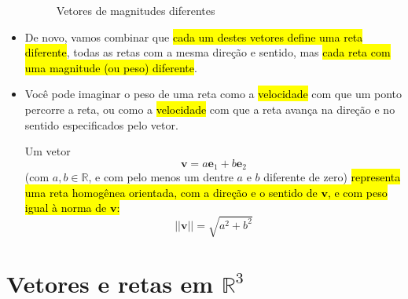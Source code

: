\documentclass[
  letterpaper,
  DIV=11,
  numbers=noendperiod]{scrreprt}
\begin{document}
\begin{itemize}
\begin{figure}[t]
{  }

  \caption{\label{fig-vetores}Vetores de magnitudes diferentes}

  \end{figure}
\item
  De novo, vamos combinar que {\hl{cada um destes vetores define uma
  reta diferente}}, todas as retas com a mesma direção e sentido, mas
  {\hl{cada reta com uma magnitude (ou peso) diferente}}.
\item
  Você pode imaginar o peso de uma reta como a {\hl{velocidade}} com que
  um ponto percorre a reta, ou como a {\hl{velocidade}} com que a reta
  avança na direção e no sentido especificados pelo vetor.

  \begin{tcolorbox}[standard jigsaw,titlerule=0mm, bottomtitle=1mm, coltitle=black, colbacktitle=quarto-callout-note-color!10!white, left=2mm, toptitle=1mm, arc=.35mm, title=\textcolor{quarto-callout-note-color}{\faInfo}\hspace{0.5em}{Resumindo: vetores \(=\) retas homogêneas orientadas e com peso}, rightrule=.15mm, bottomrule=.15mm, colframe=quarto-callout-note-color-frame, opacitybacktitle=0.6, opacityback=0, colback=white, leftrule=.75mm, toprule=.15mm]
  Um vetor \[
  \mathbf{v} = a\mathbf{e}_{1} + b\mathbf{e}_{2}
  \] (com $a, b \in \mathbb{R}$, e com pelo menos um dentre $a$ e $b$
  diferente de zero) {\hl{representa uma reta homogênea orientada, com a
  direção e o sentido de $\mathbf{v}$, e com peso igual à norma de
  $\mathbf{v}$:}} \[
  ||\mathbf{v}|| = \sqrt{a^2 + b^2}
  \]
  \end{tcolorbox}
\end{itemize}

\hypertarget{vetores-e-retas-em-mathbbr3}{%
\section{\texorpdfstring{Vetores e retas em
$\mathbb{R}^3$}{Vetores e retas em }}\label{vetores-e-retas-em-mathbbr3}}
\end{document}
